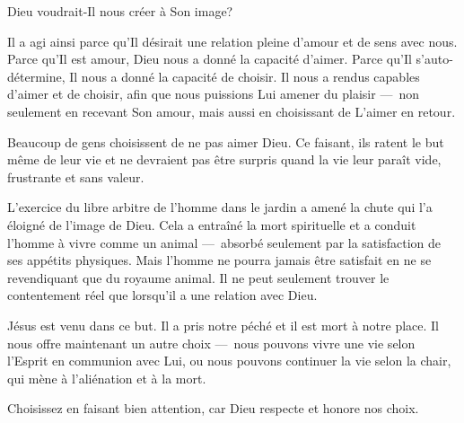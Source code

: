 




 Dieu voudrait-Il nous créer à Son image? 

Il a agi ainsi parce qu'Il désirait une relation pleine d'amour et de sens avec
 nous. Parce qu'Il est amour, Dieu nous a donné la capacité d'aimer. Parce qu'Il
 s'auto-détermine, Il nous a donné la capacité de choisir. Il nous a rendus
 capables d'aimer et de choisir, afin que nous puissions Lui amener du plaisir
 ---~non seulement en recevant Son amour, mais aussi en choisissant de L'aimer
 en retour. 

Beaucoup de gens choisissent de ne pas aimer Dieu. Ce faisant, ils ratent le but
 même de leur vie et ne devraient pas être surpris quand la vie leur paraît vide,
 frustrante et sans valeur.


L'exercice du libre arbitre de l'homme dans le jardin a amené la chute qui l'a
 éloigné de l'image de Dieu. Cela a entraîné la mort spirituelle et a conduit
 l'homme à vivre comme un animal ---~absorbé seulement par la satisfaction de ses
 appétits physiques. Mais l'homme ne pourra jamais être satisfait en ne se
 revendiquant que du royaume animal. Il ne peut seulement trouver le contentement
 réel que lorsqu'il a une relation avec Dieu. 

Jésus est venu dans ce but. Il a pris notre péché et il est mort à notre place.
 Il nous offre maintenant un autre choix ---~nous pouvons vivre une vie selon
 l'Esprit en communion avec Lui, ou nous pouvons continuer la vie selon la chair,
 qui mène à l'aliénation et à la mort. 

Choisissez en faisant bien attention, car Dieu respecte et honore nos choix. 

\dvrule




